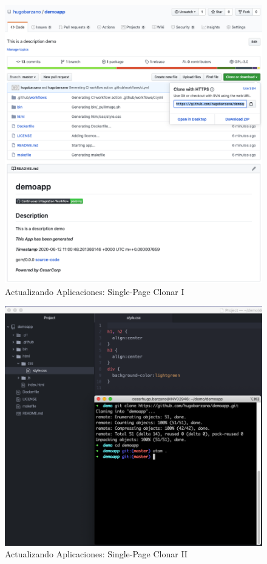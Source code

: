 \documentclass[a4paper,11pt]{book}
\begin{document}
 \begin{figure}[H]
\centering
\includegraphics[scale=0.4]{imagenes/casouso_a/2_3.png}
\caption{  Actualizando Aplicaciones: Single-Page Clonar I }
\label{2_3}
\end{figure}


\begin{figure}[H]
\centering
\includegraphics[scale=0.4]{imagenes/casouso_a/2_4.png}
\caption{  Actualizando Aplicaciones: Single-Page Clonar II }
\label{2_4}
\end{figure}
\end{document}
